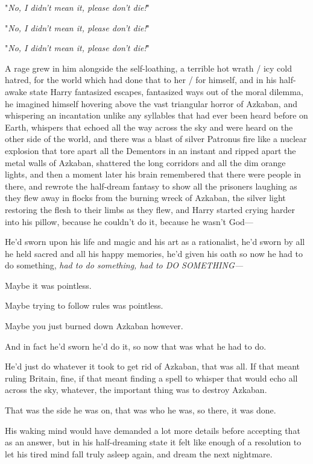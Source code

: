 "\emph{No, I didn't mean it, please don't die!}"

"\emph{No, I didn't mean it, please don't die!}"

"\emph{No, I didn't mean it, please don't die!}"

A rage grew in him alongside the self-loathing, a terrible hot wrath / icy cold
hatred, for the world which had done that to her / for himself, and in his
half-awake state Harry fantasized escapes, fantasized ways out of the moral
dilemma, he imagined himself hovering above the vast triangular horror of
Azkaban, and whispering an incantation unlike any syllables that had ever been
heard before on Earth, whispers that echoed all the way across the sky and were
heard on the other side of the world, and there was a blast of silver Patronus
fire like a nuclear explosion that tore apart all the Dementors in an instant
and ripped apart the metal walls of Azkaban, shattered the long corridors and
all the dim orange lights, and then a moment later his brain remembered that
there were people in there, and rewrote the half-dream fantasy to show all the
prisoners laughing as they flew away in flocks from the burning wreck of
Azkaban, the silver light restoring the flesh to their limbs as they flew, and
Harry started crying harder into his pillow, because he couldn't do it, because
he wasn't God—

He'd sworn upon his life and magic and his art as a rationalist, he'd sworn by
all he held sacred and all his happy memories, he'd given his oath so now he
had to do something, \emph{had to do something, had to DO SOMETHING—}

Maybe it was pointless.

Maybe trying to follow rules was pointless.

Maybe you just burned down Azkaban however.

And in fact he'd sworn he'd do it, so now that was what he had to do.

He'd just do whatever it took to get rid of Azkaban, that was all. If that
meant ruling Britain, fine, if that meant finding a spell to whisper that would
echo all across the sky, whatever, the important thing was to destroy Azkaban.

That was the side he was on, that was who he was, so there, it was done.

His waking mind would have demanded a lot more details before accepting that as
an answer, but in his half-dreaming state it felt like enough of a resolution
to let his tired mind fall truly asleep again, and dream the next nightmare.
\sbreak
\vspace{-2\baselineskip}
